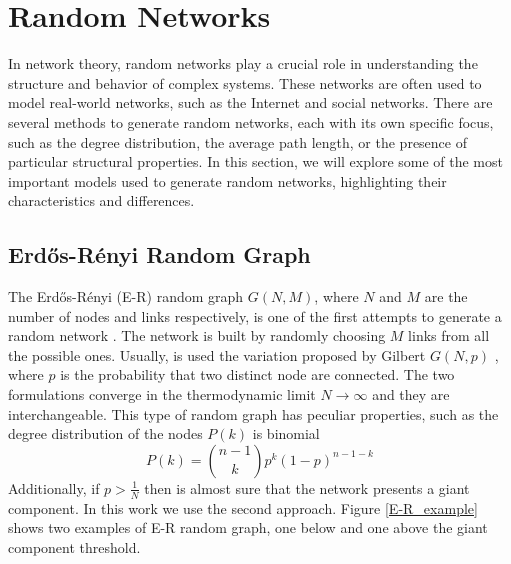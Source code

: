 \section{Random Networks}
In network theory, random networks play a crucial role in understanding the structure and behavior of complex systems. These networks are often used to model real-world networks, such as the Internet and social networks. There are several methods to generate random networks, each with its own specific focus, such as the degree distribution, the average path length, or the presence of particular structural properties. In this section, we will explore some of the most important models used to generate random networks, highlighting their characteristics and differences.

\subsection{Erd\H{o}s-Rényi Random Graph}

The Erd\H{o}s-Rényi (E-R) random graph $G(N,M)$, where $N$ and $M$ are the number of nodes and links respectively, is one of the first attempts to generate a random network \cite{erdos-renyi1960}. The network is built by randomly choosing $M$ links from all the possible ones. Usually, is used the variation proposed by Gilbert $G(N,p)$ \cite{gilbert} , where $p$ is the probability that two distinct node are connected. The two formulations converge in the thermodynamic limit $N \rightarrow \infty$ and they are interchangeable.
This type of random graph has peculiar properties, such as the degree distribution of the nodes $P(k)$ is binomial
\begin{equation}
    P(k) = \binom{n-1}{k}p^k(1-p)^{n-1-k}
\end{equation} 
Additionally, if $p > \frac{1}{N}$ then is almost sure that the network presents a giant component.
In this work we use the second approach. Figure \ref{E-R_example} shows two examples of E-R random graph, one below and one above the giant component threshold.

